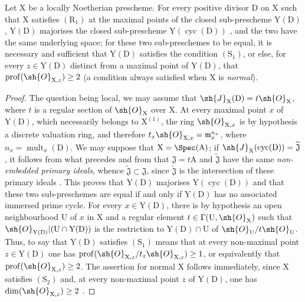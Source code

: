\begin{corollary}[21.7.3]
\label{IV.21.7.3}
Let $\mathrm{X}$ be a locally Noetherian prescheme.
For every positive divisor $\mathrm{D}$ on $\mathrm{X}$ such that $\mathrm{X}$ satisfies $(\mathrm{R}_1)$ at the maximal points of the closed sub-prescheme $\mathrm{Y}(\mathrm{D})$ , $\mathrm{Y}(\mathrm{D})$ majorises the closed sub-prescheme $\mathrm{Y}(\operatorname{cyc}(\mathrm{D}))$ , and the two have the same underlying space;
for these two sub-preschemes to be equal, it is necessary and sufficient that $\mathrm{Y}(\mathrm{D})$ satisfies the condition $(\mathrm{S}_1)$, or else, for every $z\in\mathrm{Y}(\mathrm{D})$ distinct from a maximal point of $\mathrm{Y}(\mathrm{D})$, that $\operatorname{prof}(\sh{O}_{\mathrm{X},z})\geq 2$ (a condition always satisfied when $\mathrm{X}$ is \emph{normal}).
\end{corollary}

\begin{proof}
The question being local, we may assume that $\sh{J}_\mathrm{X}(\mathrm{D})=t\sh{O}_\mathrm{X}$, where $t$ is a regular section of $\sh{O}_\mathrm{X}$ over $\mathrm{X}$.
At every maximal point $x$ of $\mathrm{Y}(\mathrm{D})$, which necessarily belongs to $\mathrm{X}^{(1)}$, the ring $\sh{O}_{\mathrm{X},x}$ is by hypothesis a discrete valuation ring, and therefore $t_x\sh{O}_{\mathrm{X},x}=\mathfrak{m}_x^{n_x}$, where $n_x=\operatorname{mult}_x(\mathrm{D})$.
We may suppose that $\mathrm{X}=\Spec(\mathrm{A})$; if $\sh{J}_\mathrm{X}(\operatorname{cyc}(\mathrm{D}))=\widetilde{\mathfrak{J}}$, it follows from what precedes and from  that $\mathfrak{J}=t\mathrm{A}$ and $\widetilde{\mathfrak{J}}$ have the same \emph{non-embedded primary ideals}, whence $\widetilde{\mathfrak{J}}\subset\mathfrak{J}$, since $\widetilde{\mathfrak{J}}$ is the intersection of
these primary ideals .
This proves that $\mathrm{Y}(\mathrm{D})$ majorises $\mathrm{Y}(\operatorname{cyc}(\mathrm{D}))$ and that these two sub-preschemes are equal if and only if $\mathrm{Y}(\mathrm{D})$ has no associated immersed prime cycle.
For every $x\in\mathrm{Y}(\mathrm{D})$, there is by hypothesis an open neighbourhood $\mathrm{U}$ of $x$ in $\mathrm{X}$ and a regular element $t\in\Gamma(\mathrm{U},\sh{O}_\mathrm{X})$ such that $\sh{O}_{\mathrm{Y}(\mathrm{D})}|(\mathrm{U}\cap\mathrm{Y}(\mathrm{D}))$ is the restriction to $\mathrm{Y}(\mathrm{D})\cap\mathrm{U}$ of $\sh{O}_\mathrm{U}/t\sh{O}_\mathrm{U}$.
Thus, to say that $\mathrm{Y}(\mathrm{D})$ satisfies $(\mathrm{S}_1)$ means that at every non-maximal point $z\in\mathrm{Y}(\mathrm{D})$ one has $\operatorname{prof}(\sh{O}_{\mathrm{X},z}/t_z\sh{O}_{\mathrm{X},z})\geq 1$, or equivalently  that $\operatorname{prof}(\sh{O}_{\mathrm{X},z})\geq 2$.
The assertion for normal $\mathrm{X}$ follows immediately, since $\mathrm{X}$ satisfies $(\mathrm{S}_2)$ and, at every non-maximal point $z$ of $\mathrm{Y}(\mathrm{D})$, one has $\dim(\sh{O}_{\mathrm{X},z})\geq 2$ .
\end{proof}

